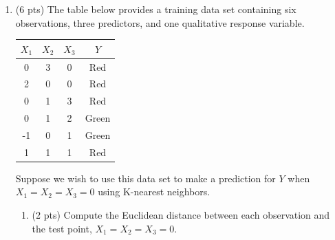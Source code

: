 \documentclass[a4paper]{article}
\theoremstyle{definition}
\begin{document}
\begin{enumerate}
\begin{enumerate}
\end{enumerate}

\item (6 pts) The table below provides a training data set containing six observations, three predictors, and one qualitative response variable.

\begin{center}
	\begin{tabular}{ c  c  c  c}
		\hline
		$X_{1}$ & $X_{2}$ & $X_{3}$ & $Y$ \\ \hline
		0 & 3 & 0 & Red \\
		2 & 0 & 0 & Red \\
		0 & 1 & 3 & Red \\
		0 & 1 & 2 & Green \\
		-1 & 0 & 1 & Green \\
		1 & 1 & 1 & Red  \\
		\hline
	\end{tabular}
\end{center}

Suppose we wish to use this data set to make a prediction for $Y$ when $X_{1} = X_{2} = X_{3} = 0$ using K-nearest neighbors.

\begin{enumerate}
	\item (2 pts) Compute the Euclidean distance between each observation and the test point, $X_{1} = X_{2} = X_{3}=0$.\\
 

\end{enumerate}
\end{enumerate}
\end{document}
